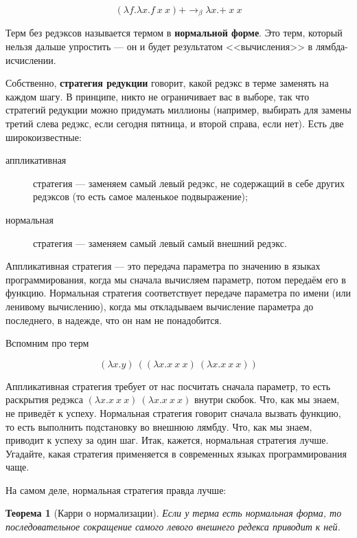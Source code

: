 \documentclass[a5paper]{article}
\newtheorem{rustheorem}{Теорема}
\begin{document}
$$(\lambda f.\lambda x.f\ x\ x) \textbf{+} \rightarrow_\beta \lambda x.\textbf{+}\ x\ x$$

Терм без редэксов называется термом в \textbf{нормальной форме}. Это терм, который нельзя дальше упростить --- он и будет результатом <<вычисления>> в лямбда-исчислении.

Собственно, \textbf{стратегия редукции} говорит, какой редэкс в терме заменять на каждом шагу. В принципе, никто не ограничивает вас в выборе, так что стратегий редукции можно придумать миллионы (например, выбирать для замены третий слева редэкс, если сегодня пятница, и второй справа, если нет). Есть две широкоизвестные:

\begin{description}
    \item[аппликативная] стратегия --- заменяем самый левый редэкс, не содержащий в себе других редэксов (то есть самое маленькое подвыражение);
    \item[нормальная] стратегия --- заменяем самый левый самый внешний редэкс.
\end{description}

Аппликативная стратегия --- это передача параметра по значению в языках программирования, когда мы сначала вычисляем параметр, потом передаём его в функцию. Нормальная стратегия соответствует передаче параметра по имени (или ленивому вычислению), когда мы откладываем вычисление параметра до последнего, в надежде, что он нам не понадобится.

Вспомним про терм

$$(\lambda x.y)\ ((\lambda x.x\ x\ x)\ (\lambda x.x\ x\ x))$$

Аппликативная стратегия требует от нас посчитать сначала параметр, то есть раскрытия редэкса $(\lambda x.x\ x\ x)\ (\lambda x.x\ x\ x)$ внутри скобок. Что, как мы знаем, не приведёт к успеху. Нормальная стратегия говорит сначала вызвать функцию, то есть выполнить подстановку во внешнюю лямбду. Что, как мы знаем, приводит к успеху за один шаг. Итак, кажется, нормальная стратегия лучше. Угадайте, какая стратегия применяется в современных языках программирования чаще.

На самом деле, нормальная стратегия правда лучше: 

\begin{rustheorem}[Карри о нормализации]
    Если у терма есть нормальная форма, то последовательное сокращение самого левого внешнего редекса приводит к ней.
\end{rustheorem}
\end{document}

